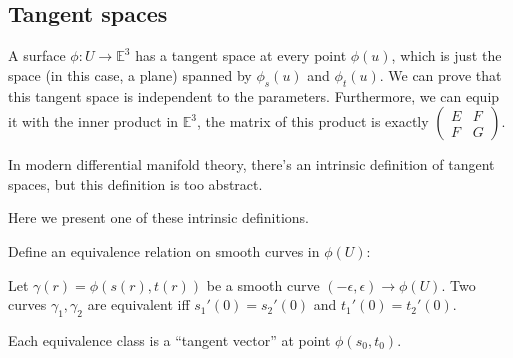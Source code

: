 \subsection{Tangent spaces}
\label{sub:Tangent spaces}

A surface $\phi:U\to \mathbb{E}^3$ has a tangent space at every point $\phi(u)$,
which is just the space (in this case, a plane) spanned by $\phi_s(u)$ and $\phi_t(u)$.
We can prove that this tangent space is independent to the parameters.
Furthermore, we can equip it with the inner product in $\mathbb{E}^3$,
the matrix of this product is exactly $\begin{pmatrix}
	E &F \\ F &G
\end{pmatrix}$.

\begin{remark}
    In modern differential manifold theory, there's an intrinsic definition of
	tangent spaces, but this definition is too abstract.
\end{remark}

Here we present one of these intrinsic definitions.
\begin{definition}
	Define an equivalence relation on smooth curves in $\phi(U)$:

	Let $\gamma(r) = \phi(s(r),t(r))$ be a smooth curve $(-\epsilon,\epsilon)\to \phi(U)$.
	Two curves $\gamma_1,\gamma_2$ are equivalent iff $s_1'(0)=s_2'(0)$ and $t_1'(0)=t_2'(0)$.

	Each equivalence class is a ``tangent vector'' at point $\phi(s_0,t_0)$.
\end{definition}
